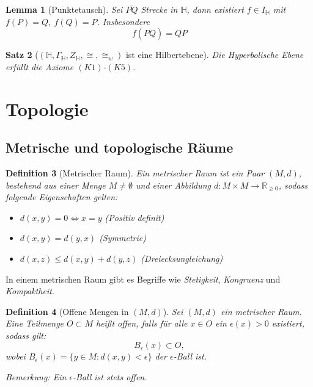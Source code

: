\documentclass[a4paper,12pt]{article}
\theoremstyle{break}
\newtheorem{definition}{Definition}[section]
\newtheorem{theorem}[definition]{Satz}
\newtheorem{lemma}[definition]{Lemma}
\begin{document}
\begin{lemma}[Punktetausch]
    Sei $\overline{PQ}$ Strecke in $\mathbb{H}$, dann existiert $f\in I_\mathbb{H}$ mit $f(P)=Q$, $f(Q)=P$. Insbesondere $$f(\overline{PQ}) = \overline{QP}$$
\end{lemma}

\begin{theorem}[$(\mathbb{H}, \Gamma_\mathbb{H}, Z_\mathbb{H}, \cong, \cong_w)$ ist eine Hilbertebene]
    Die Hyperbolische Ebene erfüllt die Axiome $(K1)$-$(K5)$.
\end{theorem}

\section{Topologie} %

\subsection{Metrische und topologische Räume} %

\begin{definition}[Metrischer Raum]
Ein \emph{metrischer Raum} ist ein Paar $(M, d)$, bestehend aus einer Menge $M \neq \emptyset$ und einer Abbildung $d: M \times M \to \mathbb{R}_{\geq 0}$, sodass folgende Eigenschaften gelten:
\begin{itemize}
    \item[(i)] $d(x, y) = 0 \iff x = y$ \hfill (Positiv definit)
    \item[(ii)] $d(x, y) = d(y, x)$ \hfill (Symmetrie)
    \item[(iii)] $d(x, z) \leq d(x, y) + d(y, z)$ \hfill (Dreiecksungleichung)
\end{itemize}
\end{definition}

In einem metrischen Raum gibt es Begriffe wie \emph{Stetigkeit}, \emph{Kongruenz} und \emph{Kompaktheit}.

\begin{definition}[Offene Mengen in $(M, d)$]
Sei $(M, d)$ ein metrischer Raum. Eine Teilmenge $O \subset M$ heißt \emph{offen}, falls für alle $x \in O$ ein $\epsilon(x) > 0$ existiert, sodass gilt:
\[
B_{\epsilon}(x) \subset O,
\]
wobei $B_{\epsilon}(x) = \{y \in M : d(x, y) < \epsilon\}$ der \emph{$\epsilon$-Ball} ist. 

Bemerkung: Ein $\epsilon$-Ball ist stets offen.
\end{definition}
\end{document}
